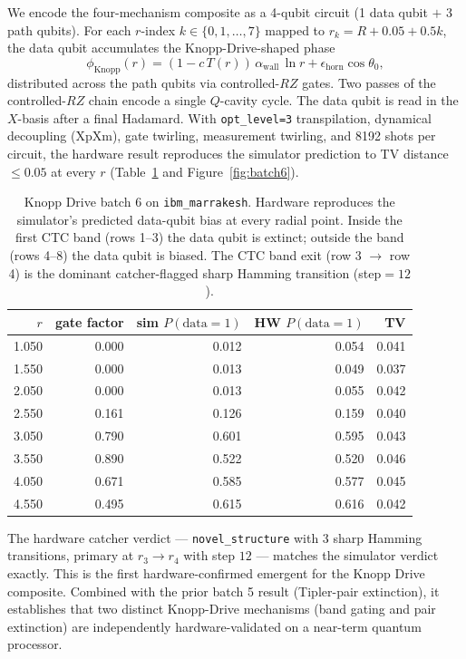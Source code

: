 \documentclass[11pt,a4paper]{article}
\begin{document}
We encode the four-mechanism composite as a 4-qubit circuit (1 data qubit $+$ 3 path qubits). For each $r$-index $k\in\{0,1,\ldots,7\}$ mapped to $r_{k}=R+0.05+0.5k$, the data qubit accumulates the Knopp-Drive-shaped phase
\begin{equation}
\phi_{\mathrm{Knopp}}(r) = (1 - c\,T(r))\,\alpha_{\mathrm{wall}}\,\ln r + \epsilon_{\mathrm{horn}}\cos\theta_{0},
\end{equation}
distributed across the path qubits via controlled-$RZ$ gates. Two passes of the controlled-$RZ$ chain encode a single $Q$-cavity cycle. The data qubit is read in the $X$-basis after a final Hadamard. With \texttt{opt\_level=3} transpilation, dynamical decoupling (XpXm), gate twirling, measurement twirling, and 8192 shots per circuit, the hardware result reproduces the simulator prediction to TV distance $\le 0.05$ at every $r$ (Table~\ref{tab:batch6} and Figure~\ref{fig:batch6}).

\begin{table}[h]
\centering
\begin{tabular}{rrrrr}
\toprule
$r$ & gate factor & sim $P(\mathrm{data}=1)$ & HW $P(\mathrm{data}=1)$ & TV \\
\midrule
1.050 & 0.000 & 0.012 & 0.054 & 0.041 \\
1.550 & 0.000 & 0.013 & 0.049 & 0.037 \\
2.050 & 0.000 & 0.013 & 0.055 & 0.042 \\
2.550 & 0.161 & 0.126 & 0.159 & 0.040 \\
3.050 & 0.790 & 0.601 & 0.595 & 0.043 \\
3.550 & 0.890 & 0.522 & 0.520 & 0.046 \\
4.050 & 0.671 & 0.585 & 0.577 & 0.045 \\
4.550 & 0.495 & 0.615 & 0.616 & 0.042 \\
\bottomrule
\end{tabular}
\caption{Knopp Drive batch 6 on \texttt{ibm\_marrakesh}. Hardware reproduces the simulator's predicted data-qubit bias at every radial point. Inside the first CTC band (rows 1--3) the data qubit is extinct; outside the band (rows 4--8) the data qubit is biased. The CTC band exit (row 3 $\to$ row 4) is the dominant catcher-flagged sharp Hamming transition (step$=12$).}\label{tab:batch6}
\end{table}

The hardware catcher verdict --- \texttt{novel\_structure} with 3 sharp Hamming transitions, primary at $r_{3}\to r_{4}$ with step $12$ --- matches the simulator verdict exactly. This is the first hardware-confirmed emergent for the Knopp Drive composite. Combined with the prior batch 5 result (Tipler-pair extinction), it establishes that two distinct Knopp-Drive mechanisms (band gating and pair extinction) are independently hardware-validated on a near-term quantum processor.
\end{document}
